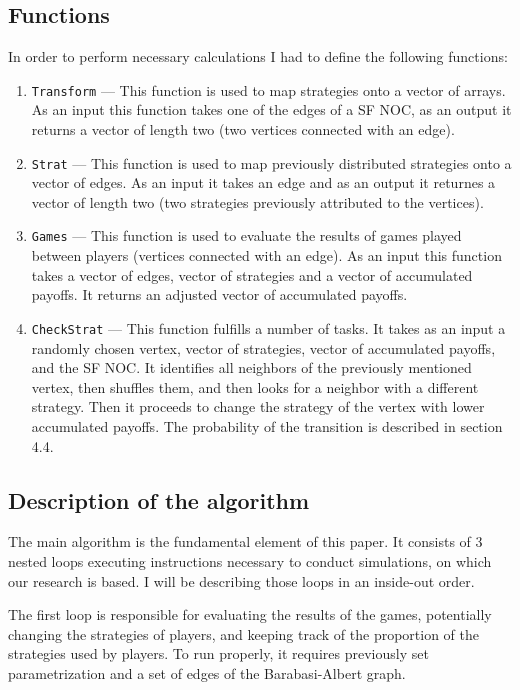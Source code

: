 \documentclass[english, twoside, 12pt, a4paper]{article}
\theoremstyle{definition}
\theoremstyle{plain}
\theoremstyle{remark}
\newcommand{\todo}[1]{\noindent{\color{red}>>~#1}}
\begin{document}
\subsection{Functions}

In order to perform necessary calculations I had to define the following functions:

\begin{enumerate}
  \item \lstinline+Transform+ --- This function is used to map strategies onto a vector of arrays. As an input this function takes one of the edges of a SF NOC,
   as an output it returns a vector of length two (two vertices connected with an edge).
  \item \lstinline+Strat+ --- This function is used to map previously distributed strategies onto a vector of edges. As an input it takes an edge and as an output
   it returnes a vector of length two (two strategies previously attributed to the vertices).
  \item \lstinline+Games+ --- This function is used to evaluate the results of games played between players (vertices connected with an edge). As an input this function
   takes a vector of edges, vector of strategies and a vector of accumulated payoffs. It returns an adjusted vector of accumulated payoffs.
  \item \lstinline+CheckStrat+ --- This function fulfills a number of tasks. It takes as an input a randomly chosen vertex, vector of strategies, vector of accumulated
  payoffs, and the SF NOC. It identifies all neighbors of the previously mentioned vertex, then shuffles them, and then looks for a neighbor
  with a different strategy. Then it proceeds to change the strategy of the vertex with lower accumulated payoffs. The probability of the transition 
  is described in section 4.4. \todo{Jak dodać odnośnik do podrozdziału 4.4?} 
\end{enumerate}

\subsection{Description of the algorithm}

The main algorithm is the fundamental element of this paper. It consists of 3 nested loops executing instructions necessary to conduct simulations, on which our research is based. I will be describing those loops in an inside-out order. 

The first loop is responsible for evaluating the results of the games, potentially changing the strategies of players, and keeping track of the proportion of the strategies used by players. To run properly, it requires previously set parametrization and a set of edges of the Barabasi-Albert graph. 
\end{document}
